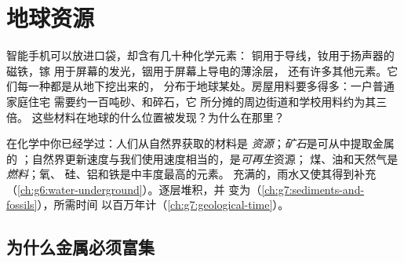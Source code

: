 \chapter{地球资源}\label{ch:g9:earth-resources}

智能手机可以放进口袋，却含有几十种化学元素：
铜用于导线，钕用于扬声器的磁铁，镓
用于屏幕的发光，铟用于屏幕上导电的薄涂层，
还有许多其他元素。它们每一种都是从地下挖出来的，
分布于地球某处。房屋用料要多得多：一户普通家庭住宅
需要约一百吨砂、和碎石，它
所分摊的周边街道和学校用料约为其三倍。
这些材料在地球的什么位置被发现？为什么在那里？

\begin{recall}
在化学中你已经学过：人们从自然界获取的材料是
\emph{资源}；\emph{矿石}是可从中提取金属的
；自然界更新速度与我们使用速度相当的，是\emph{可再生}资源；
煤、油和天然气是\emph{燃料}；氧、
硅、铝和铁是中丰度最高的元素。
充满的，雨水又使其得到补充
（\cref{ch:g6:water-underground}）。逐层堆积，并
变为（\cref{ch:g7:sediments-and-fossils}），所需时间
以百万年计（\cref{ch:g7:geological-time}）。
\end{recall}

\section{为什么金属必须富集}

